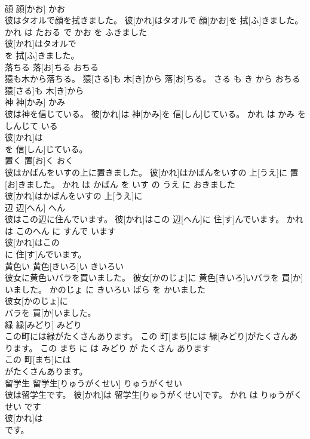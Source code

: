 \documentclass[8pt]{extreport}
\begin{document}
\begin{CJK}{UTF8}{min}
\\	顔	顔[かお]	かお	
\\	彼はタオルで顔を拭きました。	彼[かれ]はタオルで 顔[かお]を 拭[ふ]きました。	かれ は たおる で かお を ふきました	
\\	彼[かれ]はタオルで
\\	を 拭[ふ]きました。			
\\	落ちる	落[お]ちる	おちる	
\\	猿も木から落ちる。	猿[さる]も 木[き]から 落[お]ちる。	さる も き から おちる	
\\	猿[さる]も 木[き]から
\\	神	神[かみ]	かみ	
\\	彼は神を信じている。	彼[かれ]は 神[かみ]を 信[しん]じている。	かれ は かみ を しんじて いる	
\\	彼[かれ]は
\\	を 信[しん]じている。			
\\	置く	置[お]く	おく	
\\	彼はかばんをいすの上に置きました。	彼[かれ]はかばんをいすの 上[うえ]に 置[お]きました。	かれ は かばん を いす の うえ に おきました	
\\	彼[かれ]はかばんをいすの 上[うえ]に
\\	辺	辺[へん]	へん	
\\	彼はこの辺に住んでいます。	彼[かれ]はこの 辺[へん]に 住[す]んでいます。	かれ は このへん に すんで います	
\\	彼[かれ]はこの
\\	に 住[す]んでいます。			
\\	黄色い	黄色[きいろ]い	きいろい	
\\	彼女に黄色いバラを買いました。	彼女[かのじょ]に 黄色[きいろ]いバラを 買[か]いました。	かのじょ に きいろい ばら を かいました	
\\	彼女[かのじょ]に
\\	バラを 買[か]いました。			
\\	緑	緑[みどり]	みどり	
\\	この町には緑がたくさんあります。	この 町[まち]には 緑[みどり]がたくさんあります。	この まち に は みどり が たくさん あります	
\\	この 町[まち]には
\\	がたくさんあります。			
\\	留学生	留学生[りゅうがくせい]	りゅうがくせい	
\\	彼は留学生です。	彼[かれ]は 留学生[りゅうがくせい]です。	かれ は りゅうがくせい です	
\\	彼[かれ]は
\\	です。			

\end{CJK}
\end{document}
